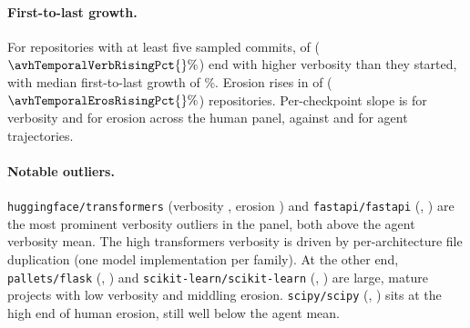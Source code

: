 \paragraph{First-to-last growth.} For repositories with at least five sampled commits, \avhTemporalVerbRising{} of \avhTemporalVerbTotal{} ($\avhTemporalVerbRisingPct{}\%$) end with higher verbosity than they started, with median first-to-last growth of \avhTemporalVerbGrowthMedian{}\%. Erosion rises in \avhTemporalErosRising{} of \avhTemporalErosTotal{} ($\avhTemporalErosRisingPct{}\%$) repositories. Per-checkpoint slope is \avhHumanVerbSlopeMedian{} for verbosity and \avhHumanErosSlopeMedian{} for erosion across the human panel, against \avhAgentVerbSlopeMedian{} and \avhAgentErosSlopeMedian{} for agent trajectories.

\paragraph{Notable outliers.} \texttt{huggingface/transformers} (verbosity \avhTransformersVerb{}, erosion \avhTransformersErosion{}) and \texttt{fastapi/fastapi} (\avhFastapiVerb{}, \avhFastapiErosion{}) are the most prominent verbosity outliers in the panel, both above the agent verbosity mean. The high transformers verbosity is driven by per-architecture file duplication (one model implementation per family). At the other end, \texttt{pallets/flask} (\avhFlaskVerb{}, \avhFlaskErosion{}) and \texttt{scikit-learn/scikit-learn} (\avhSklearnVerb{}, \avhSklearnErosion{}) are large, mature projects with low verbosity and middling erosion. \texttt{scipy/scipy} (\avhScipyVerb{}, \avhScipyErosion{}) sits at the high end of human erosion, still well below the agent mean.
